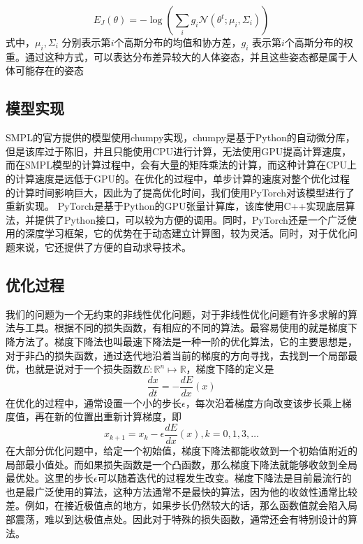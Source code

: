 $$
    E _ { J } ( \theta ) = - \log \left( \sum _ { i } g _ { i } \mathcal { N } \left( \theta ^ { t } ; \mu _ { i } , \Sigma _ { i } \right) \right)
$$
式中，$\mu_i, \Sigma_i$ 分别表示第$i$个高斯分布的均值和协方差，$g_i$ 表示第$i$个高斯分布的权重。通过这种方式，可以表达分布差异较大的人体姿态，并且这些姿态都是属于人体可能存在的姿态

\subsection{模型实现}
SMPL的官方提供的模型使用chumpy\cite{chumpy}实现，chumpy是基于Python的自动微分库，但是该库过于陈旧，并且只能使用CPU进行计算，无法使用GPU提高计算速度，而在SMPL模型的计算过程中，会有大量的矩阵乘法的计算，而这种计算在CPU上的计算速度是远低于GPU的。在优化的过程中，单步计算的速度对整个优化过程的计算时间影响巨大，因此为了提高优化时间，我们使用PyTorch对该模型进行了重新实现。
PyTorch是基于Python的GPU张量计算库，该库使用C++实现底层算法，并提供了Python接口，可以较为方便的调用。同时，PyTorch还是一个广泛使用的深度学习框架，它的优势在于动态建立计算图，较为灵活。同时，对于优化问题来说，它还提供了方便的自动求导技术。


\subsection{优化过程}
我们的问题为一个无约束的非线性优化问题，对于非线性优化问题有许多求解的算法与工具。根据不同的损失函数，有相应的不同的算法。最容易使用的就是梯度下降方法了。梯度下降法也叫最速下降法是一种一阶的优化算法，它的主要思想是，对于非凸的损失函数，通过迭代地沿着当前的梯度的方向寻找，去找到一个局部最优，也就是说对于一个损失函数\(E: \mathbb{R}^n \mapsto \mathbb{R}\)，梯度下降的定义是
\begin{equation}
    \frac{dx}{dt} = - \frac{dE}{dx}(x)
\end{equation}
在优化的过程中，通常设置一个小的步长\(\epsilon\)，每次沿着梯度方向改变该步长乘上梯度值，再在新的位置出重新计算梯度，即
\begin{equation}
    x_{k+1} = x_k - \epsilon \frac{dE}{dx}(x), k = 0,1,3,\ldots
\end{equation}
在大部分优化问题中，给定一个初始值，梯度下降法都能收敛到一个初始值附近的局部最小值处。而如果损失函数是一个凸函数，那么梯度下降法就能够收敛到全局最优处。这里的步长\(\epsilon\)可以随着迭代的过程发生改变。梯度下降法是目前最流行的也是最广泛使用的算法，这种方法通常不是最快的算法，因为他的收敛性通常比较差。例如，在接近极值点的地方，如果步长仍然较大的话，那么函数值就会陷入局部震荡，难以到达极值点处。因此对于特殊的损失函数，通常还会有特别设计的算法。

